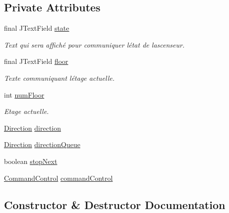 \subsection*{Private Attributes}
\begin{DoxyCompactItemize}
\item 
final J\+Text\+Field \mbox{\hyperlink{classcontrol_1_1_simulation_operational_a00a11786ca7a99c8e6ee6b3990300ac6}{state}}
\begin{DoxyCompactList}\small\item\em Text qui sera affiché pour communiquer l\textquotesingle{}état de l\textquotesingle{}ascenseur. \end{DoxyCompactList}\item 
final J\+Text\+Field \mbox{\hyperlink{classcontrol_1_1_simulation_operational_a0b981ca8176d219f57d95af4f780699d}{floor}}
\begin{DoxyCompactList}\small\item\em Texte communiquant l\textquotesingle{}étage actuelle. \end{DoxyCompactList}\item 
int \mbox{\hyperlink{classcontrol_1_1_simulation_operational_a8b244e8cd89afb3060e4025c76f3ccc1}{num\+Floor}}
\begin{DoxyCompactList}\small\item\em Etage actuelle. \end{DoxyCompactList}\item 
\mbox{\hyperlink{enumcontrol_1_1command_1_1_direction}{Direction}} \mbox{\hyperlink{classcontrol_1_1_simulation_operational_acd8854111b611282faba5ff24d894b53}{direction}}
\item 
\mbox{\hyperlink{enumcontrol_1_1command_1_1_direction}{Direction}} \mbox{\hyperlink{classcontrol_1_1_simulation_operational_a51f78d2f3a58bf6febd05b2a20459b90}{direction\+Queue}}
\item 
boolean \mbox{\hyperlink{classcontrol_1_1_simulation_operational_acda8346b0a85916ca536b13bcb704b33}{stop\+Next}}
\item 
\mbox{\hyperlink{interfacecontrol_1_1_command_control}{Command\+Control}} \mbox{\hyperlink{classcontrol_1_1_simulation_operational_a381628f543ab9b586023f718af9a279d}{command\+Control}}
\end{DoxyCompactItemize}


\subsection{Constructor \& Destructor Documentation}
\mbox{\label{classcontrol_1_1_simulation_operational_a05ea4626f887de31e4c40b3ff2e52162}} 
